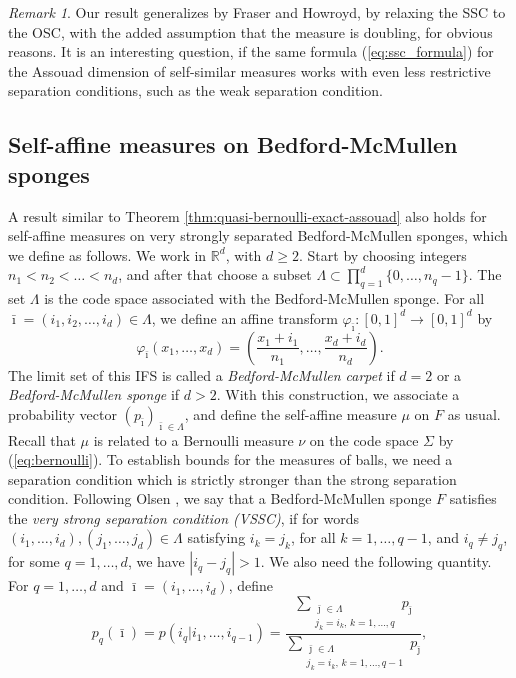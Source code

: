 \documentclass{PRM}
\newcommand{\field}[1]{\mathbb{#1}}
\newcommand{\R}{\field{R}}
\theoremstyle{plain}
\theoremstyle{definition}
\theoremstyle{remark}
\newtheorem{huom}[thm]{Remark}
\begin{document}
\begin{huom}
    Our result generalizes \cite[Theorem 2.4]{FH} by Fraser and Howroyd, by relaxing the SSC to the OSC, with the added assumption that the measure is doubling, for obvious reasons. It is an interesting question, if the same formula (\ref{eq:ssc_formula}) for the Assouad dimension of self-similar measures works with even less restrictive separation conditions, such as the weak separation condition.
\end{huom}

\subsection{Self-affine measures on Bedford-McMullen sponges}

A result similar to Theorem \ref{thm:quasi-bernoulli-exact-assouad} also holds for self-affine measures on very strongly separated Bedford-McMullen sponges, which we define as follows. We work in $\R^d$, with $d\geq 2$. Start by choosing integers $n_1<n_2<\ldots<n_d$, and after that choose a subset $\Lambda\subset \prod_{q=1}^d\{0,\ldots,n_q - 1\}$. The set $\Lambda$ is the code space associated with the Bedford-McMullen sponge. For all $\bar{\imath}=(i_1,i_2,\ldots,i_d)\in\Lambda$, we define an affine transform $\varphi_{\bar{\imath}}:[0,1]^d\to[0,1]^d$ by
\begin{equation*}
    \varphi_{\bar{\imath}}(x_1,\ldots,x_d)=\left(\frac{x_1+i_1}{n_1},\ldots,\frac{x_d+i_d}{n_d}\right).
\end{equation*}
The limit set of this IFS is called a \emph{Bedford-McMullen carpet} if $d=2$ or a \emph{Bedford-McMullen sponge} if $d>2$. With this construction, we associate a probability vector $(p_{\bar{\imath}})_{\bar{\imath}\in\Lambda}$, and define the self-affine measure $\mu$ on $F$ as usual. Recall that $\mu$ is related to a Bernoulli measure $\nu$ on the code space $\Sigma$ by (\ref{eq:bernoulli}). To establish bounds for the measures of balls, we need a separation condition which is strictly stronger than the strong separation condition. Following Olsen \cite{O}, we say that a Bedford-McMullen sponge $F$ satisfies the \emph{very strong separation condition (VSSC)}, if for words $(i_1,\ldots,i_d),(j_1,\ldots,j_d)\in\Lambda$ satisfying $i_k=j_k$, for all $k=1,\ldots, q-1$, and $i_q\ne j_q$, for some $q=1,\ldots,d$, we have $|i_q-j_q|>1$.
We also need the following quantity. For $q=1,\ldots,d$ and $\bar{\imath}=(i_1,\ldots,i_d)$, define
\begin{equation}\label{eq:cond_prob}
    p_q(\bar{\imath})=p(i_q|i_1,\ldots,i_{q-1})=\dfrac{\sum\limits_{\substack{\bar{\jmath}\in \Lambda\\ j_k=i_k,\,k=1,\ldots,q}}p_{\bar{\jmath}}}{\sum\limits_{\substack{\bar{\jmath}\in \Lambda\\ j_k=i_k,\,k=1,\ldots,q-1}}p_{\bar{\jmath}}},
\end{equation}
\end{document}
